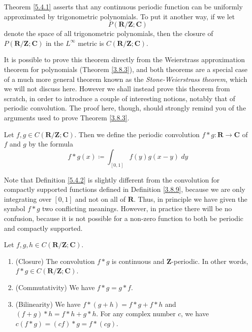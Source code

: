 \begin{note}
    Theorem \ref{5.4.1} asserts that any continuous periodic function can be uniformly approximated by trigonometric polynomials.
    To put it another way, if we let
    \[
        P(\mathbf{R} / \mathbf{Z} ; \mathbf{C})
    \]
    denote the space of all trigonometric polynomials, then the closure of \(P(\mathbf{R} / \mathbf{Z} ; \mathbf{C})\) in the \(L^\infty\) metric is \(C(\mathbf{R} / \mathbf{Z} ; \mathbf{C})\).
\end{note}

\begin{note}
    It is possible to prove this theorem directly from the Weierstrass approximation theorem for polynomials (Theorem \ref{3.8.3}), and both theorems are a special case of a much more general theorem known as the \emph{Stone-Weierstrass theorem}, which we will not discuss here.
    However we shall instead prove this theorem from scratch, in order to introduce a couple of interesting notions, notably that of periodic convolution.
    The proof here, though, should strongly remind you of the arguments used to prove Theorem \ref{3.8.3}.
\end{note}

\begin{definition}\label{5.4.2}
    Let \(f, g \in C(\mathbf{R} / \mathbf{Z} ; \mathbf{C})\).
    Then we define the periodic convolution \(f * g : \mathbf{R} \to \mathbf{C}\) of \(f\) and \(g\) by the formula
    \[
        f * g(x) \coloneqq \int_{[0, 1]} f(y) g(x - y) \; dy
    \]
\end{definition}

\begin{remark}\label{5.4.3}
    Note that Definition \ref{5.4.2} is slightly different from the convolution for compactly supported functions defined in Definition \ref{3.8.9}, because we are only integrating over \([0, 1]\) and not on all of \(\mathbf{R}\).
    Thus, in principle we have given the symbol \(f * g\) two conflicting meanings.
    However, in practice there will be no confusion, because it is not possible for a non-zero function to both be periodic and compactly supported.
\end{remark}

\begin{lemma}\label{5.4.4}
    Let \(f, g, h \in C(\mathbf{R} / \mathbf{Z} ; \mathbf{C})\).
    \begin{enumerate}
        \item (Closure)
              The convolution \(f * g\) is continuous and \(\mathbf{Z}\)-periodic.
              In other words, \(f * g \in C(\mathbf{R} / \mathbf{Z} ; \mathbf{C})\).
        \item (Commutativity)
              We have \(f * g = g * f\).
        \item (Bilinearity)
              We have \(f * (g + h) = f * g + f * h\) and \((f + g) * h = f * h + g * h\).
              For any complex number \(c\), we have \(c(f * g) = (cf) * g = f * (cg)\).
    \end{enumerate}
\end{lemma}


